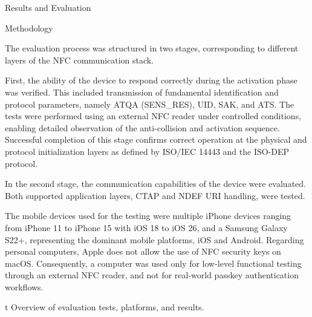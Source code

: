 \chap[evaluation] Results and Evaluation

 Methodology

The evaluation process was structured in two stages, corresponding to different layers of the NFC communication stack.

\nl First, the ability of the device to respond correctly during the activation phase was verified. This included transmission of fundamental identification and protocol parameters, namely ATQA (SENS_RES), UID, SAK, and ATS. The tests were performed using an external NFC reader under controlled conditions, enabling detailed observation of the anti-collision and activation sequence. Successful completion of this stage confirms correct operation at the physical and protocol initialization layers as defined by ISO/IEC 14443 and the ISO-DEP protocol.

\nl In the second stage, the communication capabilities of the device were evaluated. Both supported application layers, CTAP and NDEF URI handling, were tested.

\nl The mobile devices used for the testing were multiple iPhone devices ranging from iPhone 11 to iPhone 15 with iOS 18 to iOS 26, and a Samsung Galaxy S22+, representing the dominant mobile platforms, iOS and Android. Regarding personal computers, Apple does not allow the use of NFC security keys on macOS. Consequently, a computer was used only for low-level functional testing through an external NFC reader, and not for real-world passkey authentication workflows.

\midinsert
{}
{\typosize[9/11]
}
\caption/t Overview of evaluation tests, platforms, and results.
\endinsert

